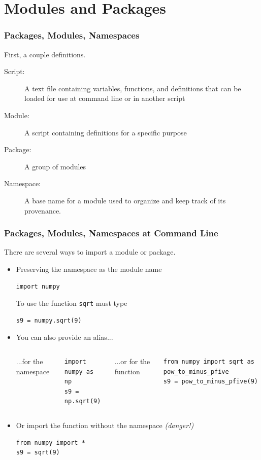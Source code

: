 \documentclass{beamer}
\begin{document}
\section[]{Modules and Packages}
\begin{frame}[fragile]
\frametitle{Packages, Modules, Namespaces}
First, a couple definitions.
\begin{description}
\item[Script:] A text file containing variables, functions, and definitions that can be 
 loaded for use at command line or in another script
\item[Module:] A script containing definitions for a specific purpose
\item[Package:] A group of modules
\item[Namespace:] A base name for a module used to organize and keep track of its provenance.
\end{description}
\end{frame}

\begin{frame}[fragile]
\frametitle{Packages, Modules, Namespaces at Command Line}
There are several ways to import a module or package.
\begin{itemize}
\pause
\item Preserving the namespace as the module name
\begin{lstlisting}
import numpy
\end{lstlisting}
To use the function \texttt{sqrt} must type
\begin{lstlisting}
s9 = numpy.sqrt(9)
\end{lstlisting}
\pause
\item {You can also provide an alias...}
\begin{columns}[c]
\column{3.5cm}
...for the namespace
\begin{lstlisting}
import numpy as np
s9 = np.sqrt(9)
\end{lstlisting}
\column{4.5cm}
...or for the function
\begin{lstlisting}
from numpy import sqrt as pow_to_minus_pfive
s9 = pow_to_minus_pfive(9)
\end{lstlisting}
\end{columns}
\pause
\item Or import the function without the namespace \emph{(danger!)}
\begin{lstlisting}
from numpy import *
s9 = sqrt(9)
\end{lstlisting}
\end{itemize}
\end{frame}
\end{document}
